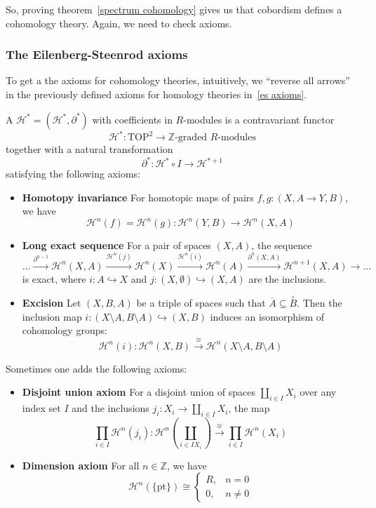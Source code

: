 \documentclass[a4paper,11pt]{article}
\begin{document}
So, proving theorem\ \ref{spectrum cohomology} gives us that cobordism defines a cohomology theory. Again, we need to check axioms.

\subsubsection{The Eilenberg-Steenrod axioms}
To get a the axioms for cohomology theories, intuitively, we \enquote{reverse all arrows} in the previously defined axioms for homology theories in\ \ref{es axioms}.

\begin{definition}
    A  \(\mathcal{H}^\ast=(\mathcal{H}^\ast,\partial^\ast)\) with coefficients in \(R\)-modules is a contravariant functor \[\mathcal{H}^\ast:\mathrm{TOP}^2\to\mathbb{Z}\text{-graded }R\text{-modules}\] together with a natural transformation \[\partial^\ast:\mathcal{H}^\ast\circ I\to\mathcal{H}^{\ast+1}\] satisfying the following axioms:
    \begin{itemize}
        \item \textbf{Homotopy invariance} For homotopic maps of pairs \(f,g:(X,A\to Y,B)\), we have \[\mathcal{H}^n(f)=\mathcal{H}^n(g):\mathcal{H}^n(Y,B)\to\mathcal{H}^n(X,A)\]
        \item \textbf{Long exact sequence} For a pair of spaces \((X,A)\), the sequence \[\dots\xrightarrow{\partial^{n-1}}\mathcal{H}^n(X,A)\xrightarrow{\mathcal{H}^n(j)}\mathcal{H}^n(X)\xrightarrow{\mathcal{H}^n(i)}\mathcal{H}^n(A)\xrightarrow{\partial^n(X,A)}\mathcal{H}^{n+1}(X,A)\rightarrow\dots\] is exact, where \(i:A\hookrightarrow X\) and \(j:(X,\emptyset)\hookrightarrow (X,A)\) are the inclusions.
        \item \textbf{Excision} Let \((X,B,A)\) be a triple of spaces such that \(\overline{A}\subseteq\overset{\circ}{B}\). Then the inclusion map \(i:(X\setminus A,B\setminus A)\hookrightarrow(X,B)\) induces an isomorphism of cohomology groups: \[\mathcal{H}^n(i):\mathcal{H}^n(X,B)\xrightarrow{\cong}\mathcal{H}^n(X\setminus A, B\setminus A)\]
    \end{itemize}
    Sometimes one adds the following axioms:
    \begin{itemize}
        \item \textbf{Disjoint union axiom}
        For a disjoint union of spaces \(\coprod_{i\in I}X_i\) over any index set \(I\) and the inclusions \(j_i:X_i\to\coprod_{i\in I}X_i\), the map
        \[\prod_{i\in I}\mathcal{H}^n(j_i):\mathcal{H}^n\left(\coprod_{i\in I X_i}\right)\xrightarrow{\cong}\prod_{i\in I}\mathcal{H}^n(X_i)\]
        \item \textbf{Dimension axiom}
        For all \(n\in\mathbb{Z}\), we have \[\mathcal{H}^n(\{\mathrm{pt}\})\cong\begin{cases} R, & n=0\\ 0, & n\neq0\end{cases}\]
    \end{itemize}
\end{definition}
\end{document}
